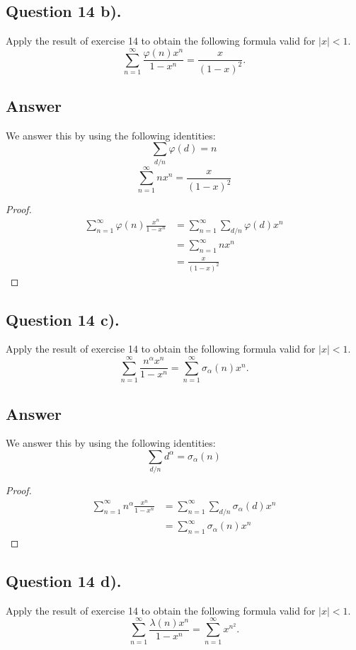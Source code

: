 \subsection{Question 14 b).}
\noindent
Apply the result of exercise 14 to obtain the following formula valid for $|x|<1$.
\[
    \sum_{n=1}^{\infty} \frac{\varphi(n) x^n}{1-x^n} = \frac{x}{(1-x)^2}.
\]

\subsection*{Answer}
\noindent
We answer this by using the following identities:
\[
    \sum_{d/n}\varphi(d) = n
\]
\[
    \sum_{n=1}^{\infty} n x^n = \frac{x}{(1-x)^2}
\]

\begin{proof}
    \begin{align*}
        \sum_{n=1}^{\infty}\varphi(n) \frac{x^n}{1-x^n} &= \sum_{n=1}^{\infty} \sum_{d/n} \varphi(d) x^n \\
        &= \sum_{n=1}^{\infty} n x^n \\
        &= \frac{x}{(1-x)^2}
    \end{align*}
\end{proof}


\subsection{Question 14 c).}
\noindent
Apply the result of exercise 14 to obtain the following formula valid for $|x|<1$.
\[
    \sum_{n=1}^{\infty} \frac{n^\alpha x^n}{1-x^n} = \sum_{n=1}^{\infty} \sigma_{\alpha}(n)x^n.
\]

\subsection*{Answer}
\noindent
We answer this by using the following identities:
\[
    \sum_{d/n}d^\alpha = \sigma_{\alpha}(n)
\]

\begin{proof}
    \begin{align*}
        \sum_{n=1}^{\infty}n^\alpha \frac{x^n}{1-x^n} &= \sum_{n=1}^{\infty} \sum_{d/n} \sigma_{\alpha}(d) x^n \\
        &= \sum_{n=1}^{\infty} \sigma_{\alpha}(n) x^n
    \end{align*}
\end{proof}


\subsection{Question 14 d).}
\noindent
Apply the result of exercise 14 to obtain the following formula valid for $|x|<1$.
\[
    \sum_{n=1}^{\infty} \frac{\lambda(n) x^n}{1-x^n} = \sum_{n=1}^{\infty} x^{n^2}.
\]


